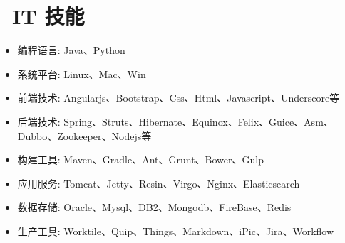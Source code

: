 \documentclass{resume}
\begin{document}



\section{\faRocket\ IT 技能}
\begin{itemize}[parsep=0.5ex]
  \item 编程语言: Java、Python
  \item 系统平台: {\faLinux}Linux、{\faApple}Mac、{\faWindows}Win
  \item 前端技术: Angularjs、Bootstrap、Css、Html、Javascript、Underscore等
  \item 后端技术: Spring、Struts、Hibernate、Equinox、Felix、Guice、Asm、Dubbo、Zookeeper、Nodejs等
  \item 构建工具: Maven、Gradle、Ant、Grunt、Bower、Gulp
  \item 应用服务: Tomcat、Jetty、Resin、Virgo、Nginx、Elasticsearch
  \item 数据存储: Oracle、Mysql、DB2、Mongodb、FireBase、Redis
  \item 生产工具: Worktile、Quip、Things、Markdown、iPic、Jira、Workflow
\end{itemize}
  
\end{document}
